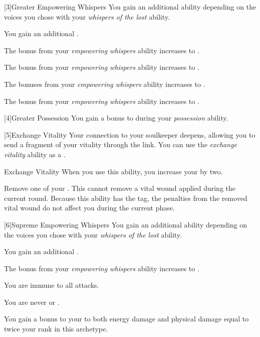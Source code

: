         [3]{Greater Empowering Whispers} You gain an additional ability depending on the voices you chose with your \textit{whispers of the lost} ability.
        {
             You gain an additional .

             The bonus from your \textit{empowering whispers} ability increases to .

             The bonus from your \textit{empowering whispers} ability increases to .

             The bonuses from your \textit{empowering whispers} ability increases to .

             The bonus from your \textit{empowering whispers} ability increases to .
        }

        [4]{Greater Possession} You gain a  bonus to  during your \textit{possession} ability.

        [5]{Exchange Vitality} Your connection to your soulkeeper deepens, allowing you to send a fragment of your vitality through the link.
        You can use the \textit{exchange vitality} ability as a .
        \begin{instantability}{Exchange Vitality}
            \rankline
            When you use this ability, you increase your  by two.

            Remove one of your .
            This cannot remove a vital wound applied during the current round.
            Because this ability has the  tag, the penalties from the removed vital wound do not affect you during the current phase.
        \end{instantability}

        [6]{Supreme Empowering Whispers} You gain an additional ability depending on the voices you chose with your \textit{whispers of the lost} ability.
        {
             You gain an additional .

             The bonus from your \textit{empowering whispers} ability increases to .

             You are immune to all  attacks.

             You are never \unaware or \partiallyunaware.

             You gain a bonus to your  to both energy damage and physical damage equal to twice your rank in this archetype.
        }

